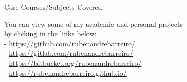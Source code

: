 \documentclass[10pt,a4paper,academicons]{altacv}
\begin{document}
\divider

\clearpage


{\small\faBook\hspace{0.5em}Core Courses/Subjects Covered:\begin{itemize}

\end{itemize}
}

\divider

{\footnotesize You can view some of my academic and personal projects\\
by clicking in the links below:\\
- \href{https://github.com/rubenandrebarreiro/}{https://github.com/rubenandrebarreiro/}\\
- \href{https://gitlab.com/rubenandrebarreiro/}{https://gitlab.com/rubenandrebarreiro/}\\
- \href{https://bitbucket.org/rubenandrebarreiro/}{https://bitbucket.org/rubenandrebarreiro/}\\
- \href{https://rubenandrebarreiro.github.io/}{https://rubenandrebarreiro.github.io/}\\
}

\divider

\clearpage

\end{document}

